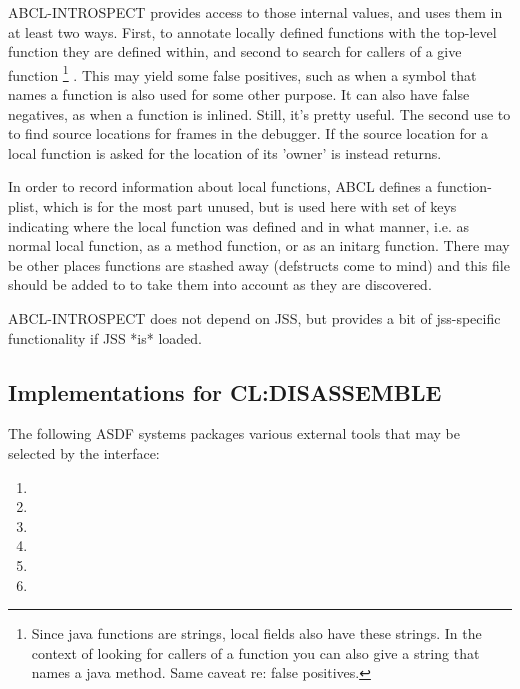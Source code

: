 \documentclass[10pt]{book}
\begin{document}
\textsc{ABCL-INTROSPECT} provides access to those internal values, and
uses them in at least two ways. First, to annotate locally defined
functions with the top-level function they are defined within, and
second to search for callers of a give function \footnote{ Since java
  functions are strings, local fields also have these strings. In the
  context of looking for callers of a function you can also give a
  string that names a java method. Same caveat re: false positives.}
. This may yield some false positives, such as when a symbol that
names a function is also used for some other purpose. It can also have
false negatives, as when a function is inlined. Still, it's pretty
useful. The second use to to find source locations for frames in the
debugger. If the source location for a local function is asked for the
location of its 'owner' is instead returns.

In order to record information about local functions, \textsc{ABCL}
defines a function-plist, which is for the most part unused, but is
used here with set of keys indicating where the local function was
defined and in what manner, i.e. as normal local function, as a method
function, or as an initarg function. There may be other places
functions are stashed away (defstructs come to mind) and this file
should be added to to take them into account as they are discovered.

\textsc{ABCL-INTROSPECT} does not depend on \textsc{JSS}, but provides
  a bit of jss-specific functionality if \textsc{JSS} *is* loaded.

\subsection{Implementations for CL:DISASSEMBLE}
\label{abcl-introspect-disassemblers}

The following ASDF systems packages various external tools that may be
selected by the  interface:

\begin{enumerate}
\item {}
\item {}
\item {}
\item {}
\item {}
\item {}
\end{enumerate}
\end{document}

